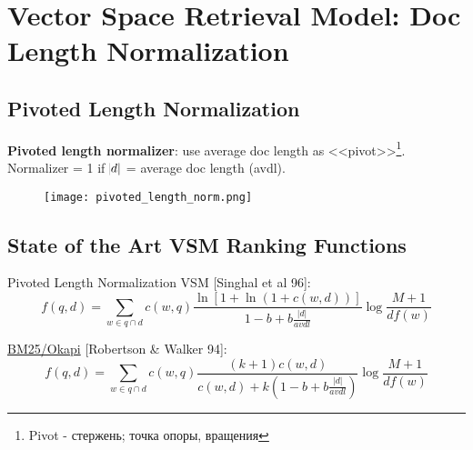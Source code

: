 \section{Vector Space Retrieval Model: Doc Length Normalization}


\subsection{Pivoted Length Normalization}

\textbf{Pivoted length normalizer}: use average doc length as <<pivot>>\footnote{Pivot - стержень; точка опоры, вращения}. Normalizer = 1 if $\abs{d}$ = average doc length (avdl).

\begin{figure}[H]
    \centering
    \texttt{[image: pivoted\_length\_norm.png]}
\end{figure}



\subsection{State of the Art VSM Ranking Functions}

Pivoted Length Normalization VSM [Singhal et al 96]:
\begin{equation*}
f(q, d) = \sum_{w \in q \cap d} c(w, q) \frac{\ln[1+\ln(1+c(w, d))]}{1-b+b\frac{|d|}{avdl}} \log \frac{M+1}{df(w)}
\end{equation*}


\href{https://ru.wikipedia.org/wiki/Okapi_BM25}{BM25/Okapi} [Robertson \& Walker 94]:
\begin{equation*}
f(q, d) = \sum_{w \in q \cap d} c(w, q) \frac{(k+1) c(w, d)}{c(w, d) + k\left(1-b+b\frac{|d|}{avdl}\right)} \log \frac{M+1}{df(w)}
\end{equation*}



